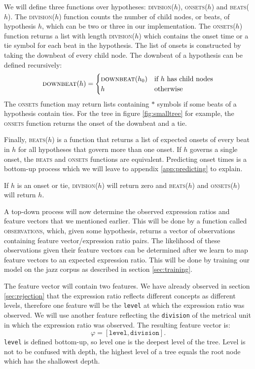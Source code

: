 We will define three functions over hypotheses: \textsc{division}($h$), \textsc{onsets}($h$) and \textsc{beats}($h$). The \textsc{division}($h$) function counts the number of child nodes, or beats, of hypothesis $h$, which can be two or three in our implementation. The \textsc{onsets}($h$) function returns a list with length \textsc{division}($h$) which contains the onset time or a tie symbol for each beat in the hypothesis. The list of onsets is constructed by taking the downbeat of every child node. The downbeat of a hypothesis can be defined recursively:
\begin{equation}
\textsc{downbeat}(h) = 
\begin{cases}
   \textsc{downbeat}(h_0) & \mbox{if $h$ has child nodes}\\
   h & \mbox{otherwise}\\
  \end{cases}
\end{equation}
The \textsc{onsets} function may return lists containing $*$ symbols if some beats of a hypothesis contain ties. For the tree in figure \ref{fig:smalltree} for example, the \textsc{onsets} function returns the onset of the downbeat and a tie.

Finally, \textsc{beats}($h$) is a function that returns a list of expected onsets of every beat in $h$ for all hypotheses that govern more than one onset. If $h$ governs a single onset, the \textsc{beats} and \textsc{onsets} functions are equivalent. Predicting onset times is a bottom-up process which we will leave to appendix \ref{app:predicting} to explain.

If $h$ is an onset or tie, \textsc{division}($h$) will return zero and \textsc{beats}($h$) and \textsc{onsets}($h$)
will return $h$.

A top-down process will now determine the observed expression ratios and feature vectors that we mentioned earlier. This will be done by a function called \textsc{observations}, which, given some hypothesis, returns a vector of observations containing feature vector/expression ratio pairs. The likelihood of these observations given their feature vectors can be determined after we learn to map feature vectors to an expected expression ratio. This will be done by training our model on the jazz corpus as described in section \ref{sec:training}.

The feature vector will contain two features. We have already observed in section \ref{sec:rejection} that the expression ratio reflects different concepts as different levels, therefore one feature will be the \texttt{level} at which the expression ratio was observed. We will use another feature reflecting the \texttt{division} of the metrical unit in which the expression ratio was observed. The resulting feature vector is:
\begin{equation}
\label{eq:features}
\varphi = [\texttt{level}, \texttt{division}].
\end{equation}
\texttt{level} is defined bottom-up, so level one is the deepest level of the tree. Level is not to be confused with depth, the highest level of a tree equals the root node which has the shallowest depth.

